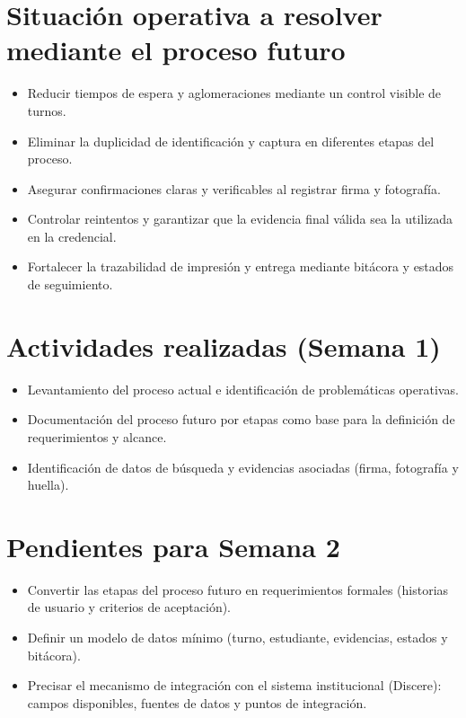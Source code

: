 \documentclass[12pt,a4paper]{article}
\begin{document}
\section{Situación operativa a resolver mediante el proceso futuro}
\begin{itemize}
  \item Reducir tiempos de espera y aglomeraciones mediante un control visible de turnos.
  \item Eliminar la duplicidad de identificación y captura en diferentes etapas del proceso.
  \item Asegurar confirmaciones claras y verificables al registrar firma y fotografía.
  \item Controlar reintentos y garantizar que la evidencia final válida sea la utilizada en la credencial.
  \item Fortalecer la trazabilidad de impresión y entrega mediante bitácora y estados de seguimiento.
\end{itemize}

\section{Actividades realizadas (Semana 1)}
\begin{itemize}
  \item Levantamiento del proceso actual e identificación de problemáticas operativas.
  \item Documentación del proceso futuro por etapas como base para la definición de requerimientos y alcance.
  \item Identificación de datos de búsqueda y evidencias asociadas (firma, fotografía y huella).
\end{itemize}

\section{Pendientes para Semana 2}
\begin{itemize}
  \item Convertir las etapas del proceso futuro en requerimientos formales (historias de usuario y criterios de aceptación).
  \item Definir un modelo de datos mínimo (turno, estudiante, evidencias, estados y bitácora).
  \item Precisar el mecanismo de integración con el sistema institucional (Discere): campos disponibles, fuentes de datos y puntos de integración.
\end{itemize}
\end{document}
